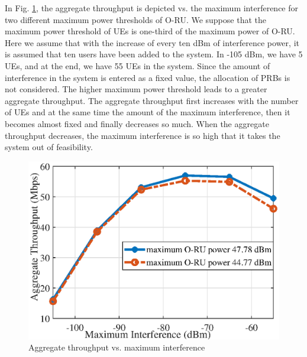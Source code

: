 \documentclass[lettersize,journal]{IEEEtran}
\begin{document}
In Fig. \ref{fig:13}, the aggregate throughput is depicted vs. the maximum interference for two different maximum power thresholds of O-RU. We suppose that the maximum power threshold of UEs is one-third of the maximum power of O-RU.
Here we assume that with the increase of every ten dBm of interference power, it is assumed that ten users have been added to the system. In -105 dBm, we have 5 UEs, and at the end, we have 55 UEs in the system.
Since the amount of interference in the system is entered as a fixed value,
the allocation of PRBs is not considered.
The higher maximum power threshold leads to a greater aggregate throughput.
The aggregate throughput first increases with the number of UEs and at the same time the amount of the maximum interference, then it becomes almost fixed and finally decreases so much. When the aggregate throughput decreases, the maximum interference is so high that it takes the system out of feasibility.
\begin{figure}%
  \centering
   \includegraphics[scale = 0.5]{fig/interF_newn.eps}
  \caption{\small Aggregate throughput vs. maximum interference }
  \label{fig:13}
\end{figure}
\end{document}
